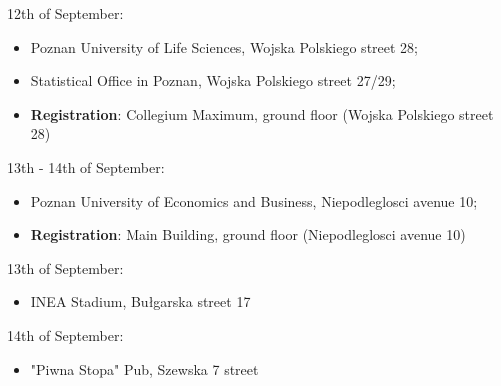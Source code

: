 12th of September:

\begin{itemize}
        \item Poznan University of Life Sciences, Wojska Polskiego street 28;
        \item Statistical Office in Poznan, Wojska Polskiego street 27/29;
        \item \textbf{Registration}: Collegium Maximum, ground floor (Wojska Polskiego street 28)
\end{itemize}

13th - 14th of September:

\begin{itemize}
        \item Poznan University of Economics and Business, Niepodleglosci avenue 10;
        \item \textbf{Registration}: Main Building, ground floor (Niepodleglosci avenue 10)
\end{itemize}

13th of September:

\begin{itemize}
        \item INEA Stadium, Bułgarska street 17
\end{itemize}

14th of September: 

\begin{itemize}
        \item "Piwna Stopa" Pub, Szewska 7 street
\end{itemize}
